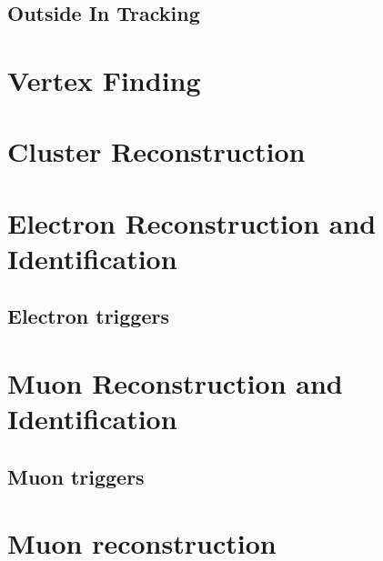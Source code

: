 \subsection{Outside In Tracking}

\label{sec:reco-tracking}
\section{Vertex Finding}
\label{sec:reco-vertexing}
\section{Cluster Reconstruction}
\label{sec:reco-clustering}
\section{Electron Reconstruction and Identification}
\label{sec:reco-el}
\subsection{Electron triggers}
\label{sec:reco-triggers}
\section{Muon Reconstruction and Identification}
\label{sec:reco-mu}
\subsection{Muon triggers}
\label{sec:reco-triggers}
\section{Muon reconstruction}
